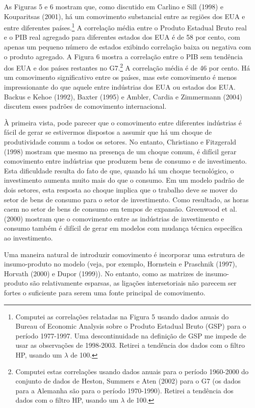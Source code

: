 \documentclass[12pt]{article}
\begin{document}
As Figuras 5 e 6 mostram que, como discutido em Carlino e Sill (1998) e Kouparitsas (2001), há um comovimento substancial entre as regiões dos EUA e entre diferentes países.\footnote{Computei as correlações relatadas na Figura 5 usando dados anuais do Bureau of Economic Analysis sobre o Produto Estadual Bruto (GSP) para o período 1977-1997. Uma descontinuidade na definição de GSP me impede de usar as observações de 1998-2003. Retirei a tendência dos dados com o filtro HP, usando um $\lambda$ de 100.} A correlação média entre o Produto Estadual Bruto real e o PIB real agregado para diferentes estados dos EUA é de 58 por cento, com apenas um pequeno número de estados exibindo correlação baixa ou negativa com o produto agregado. A Figura 6 mostra a correlação entre o PIB sem tendência dos EUA e dos países restantes no G7.\footnote{Computei estas correlações usando dados anuais para o período 1960-2000 do conjunto de dados de Heston, Summers e Aten (2002) para o G7 (os dados para a Alemanha são para o período 1970-1990). Retirei a tendência dos dados com o filtro HP, usando um $\lambda$ de 100.} A correlação média é de 46 por cento. Há um comovimento significativo entre os países, mas este comovimento é menos impressionante do que aquele entre indústrias dos EUA ou estados dos EUA. Backus e Kehoe (1992), Baxter (1995) e Ambler, Cardia e Zimmermann (2004) discutem esses padrões de comovimento internacional.

À primeira vista, pode parecer que o comovimento entre diferentes indústrias é fácil de gerar se estivermos dispostos a assumir que há um choque de produtividade comum a todos os setores. No entanto, Christiano e Fitzgerald (1998) mostram que mesmo na presença de um choque comum, é difícil gerar comovimento entre indústrias que produzem bens de consumo e de investimento. Esta dificuldade resulta do fato de que, quando há um choque tecnológico, o investimento aumenta muito mais do que o consumo. Em um modelo padrão de dois setores, esta resposta ao choque implica que o trabalho deve se mover do setor de bens de consumo para o setor de investimento. Como resultado, as horas caem no setor de bens de consumo em tempos de expansão. Greenwood et al. (2000) mostram que o comovimento entre as indústrias de investimento e consumo também é difícil de gerar em modelos com mudança técnica específica ao investimento.

Uma maneira natural de introduzir comovimento é incorporar uma estrutura de insumo-produto no modelo (veja, por exemplo, Hornstein e Praschnik (1997), Horvath (2000) e Dupor (1999)). No entanto, como as matrizes de insumo-produto são relativamente esparsas, as ligações intersetoriais não parecem ser fortes o suficiente para serem uma fonte principal de comovimento.
\end{document}
